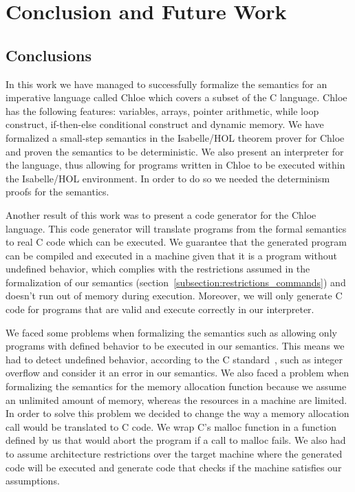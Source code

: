 \chapter{Conclusion and Future Work}\label{chapter:conclusion}

\section{Conclusions}

In this work we have managed to successfully formalize the semantics for an imperative language called Chloe which covers a subset of the C language.
Chloe has the following features: variables, arrays, pointer arithmetic, while loop construct, if-then-else conditional construct and dynamic memory.
We have formalized a small-step semantics in the Isabelle/HOL theorem prover for Chloe and proven the semantics to be deterministic.
We also present an interpreter for the language, thus allowing for programs written in Chloe to be executed within the Isabelle/HOL environment.
In order to do so we needed the determinism proofs for the semantics.

Another result of this work was to present a code generator for the Chloe language.
This code generator will translate programs from the formal semantics to real C code which can be executed.
We guarantee that the generated program can be compiled and executed in a machine given that it is a program without undefined behavior, which complies with the restrictions assumed in the formalization of our semantics (section~\ref{subsection:restrictions_commands}) and doesn't run out of memory during execution.
Moreover, we will only generate C code for programs that are valid and execute correctly in our interpreter.

We faced some problems when formalizing the semantics such as allowing only programs with defined behavior to be executed in our semantics.
This means we had to detect undefined behavior, according to the C standard~\parencite{c99}, such as integer overflow and consider it an error in our semantics.
We also faced a problem when formalizing the semantics for the memory allocation function because we assume an unlimited amount of memory, whereas the resources in a machine are limited.
In order to solve this problem we decided to change the way a memory allocation call would be translated to C code.
We wrap C's malloc function in a function defined by us that would abort the program if a call to malloc fails.
We also had to assume architecture restrictions over the target machine where the generated code will be executed and generate code that checks if the machine satisfies our assumptions.

